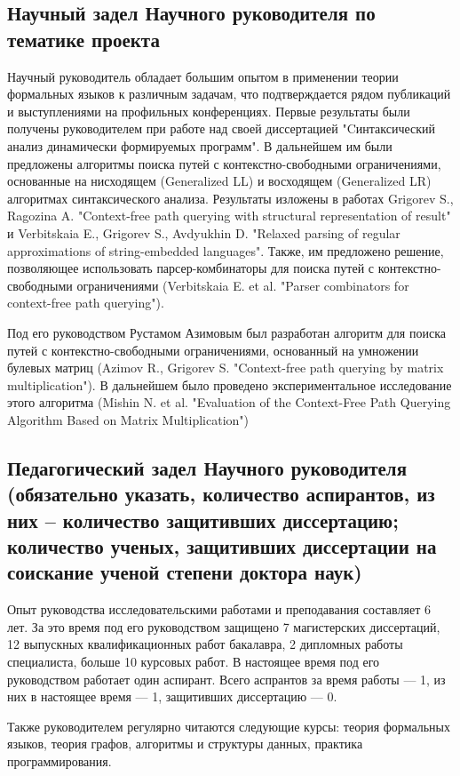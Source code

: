 \documentclass[12pt]{article}  %
\theoremstyle{remark}
\begin{document}
\subsection{Научный задел Научного руководителя по тематике проекта}
Научный руководитель обладает большим опытом в применении теории формальных языков к различным задачам, что подтверждается рядом публикаций и выступлениями на профильных конференциях.
Первые результаты были получены руководителем при работе над своей диссертацией "Cинтаксический анализ динамически формируемых программ". В дальнейшем им были предложены алгоритмы поиска путей с контекстно-свободными ограничениями, основанные на нисходящем (Generalized LL) и восходящем (Generalized LR) алгоритмах синтаксического анализа. Результаты изложены в работах Grigorev S., Ragozina A. "Context-free path querying with structural representation of result" и Verbitskaia E., Grigorev S., Avdyukhin D. "Relaxed parsing of regular approximations of string-embedded languages". Также, им предложено решение, позволяющее использовать парсер-комбинаторы для поиска путей с контекстно-свободными ограничениями (Verbitskaia E. et al. "Parser combinators for context-free path querying").

Под его руководством Рустамом Азимовым был разработан алгоритм для поиска путей с контекстно-свободными ограничениями, основанный на умножении булевых матриц (Azimov R., Grigorev S. "Context-free path querying by matrix multiplication"). В дальнейшем было проведено экспериментальное исследование этого алгоритма (Mishin N. et al. "Evaluation of the Context-Free Path Querying Algorithm Based on Matrix Multiplication")

\subsection{Педагогический задел Научного руководителя (обязательно указать, количество аспирантов, из них – количество защитивших диссертацию; количество ученых, защитивших диссертации на соискание ученой степени доктора наук)}
Опыт руководства исследовательскими работами и преподавания составляет 6 лет.
За это время под его руководством защищено 7 магистерских диссертаций, 12 выпускных квалификационных работ бакалавра, 2 дипломных работы специалиста, больше 10 курсовых работ. В настоящее время под его руководством работает один аспирант. Всего аспрантов за время работы --- 1, из них в настоящее время --- 1, защитивших диссертацию --- 0.

Также руководителем регулярно читаются следующие курсы: теория формальных языков, теория графов, алгоритмы и структуры данных, практика программирования.
\end{document}
